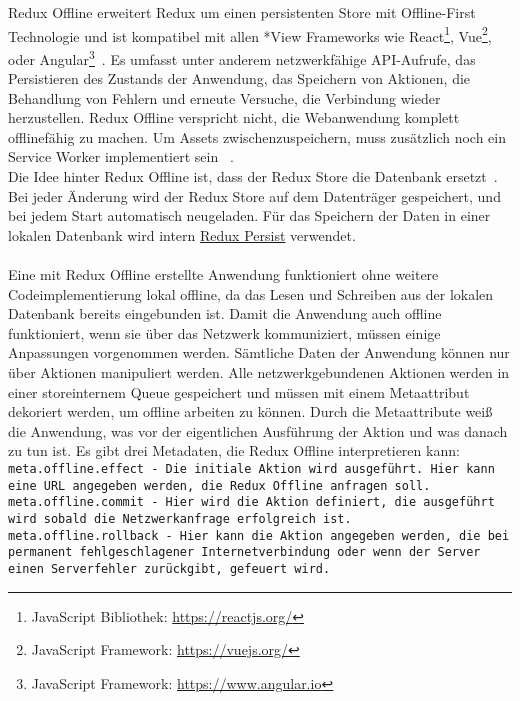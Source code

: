 % 
% 
Redux Offline erweitert Redux um einen persistenten Store mit Offline-First Technologie und ist kompatibel mit allen *View Frameworks wie React\footnote{JavaScript Bibliothek: \url{https://reactjs.org/}}, Vue\footnote{JavaScript Framework: \url{https://vuejs.org/}}, oder Angular\footnote{JavaScript Framework: \url{https://www.angular.io}}~\cite{redux-offline-compabilaty}.
Es umfasst unter anderem netzwerkfähige \gls{API}-Aufrufe, das Persistieren des Zustands der Anwendung, das Speichern von Aktionen, die Behandlung von Fehlern und erneute Versuche, die Verbindung wieder herzustellen.
Redux Offline verspricht nicht, die Webanwendung komplett offlinefähig zu machen.
Um \gls{Assets} zwischenzuspeichern, muss zusätzlich noch ein Service Worker implementiert sein ~\cite{redux-offline-gh}.\\
Die Idee hinter Redux Offline ist, dass der Redux Store die Datenbank ersetzt~\cite{redux-offline}.
Bei jeder Änderung wird der Redux Store auf dem Datenträger gespeichert, und bei jedem Start automatisch neugeladen.
Für das Speichern der Daten in einer lokalen Datenbank wird intern \hyperref[sub:reduxpersist]{Redux Persist} verwendet.\\\\
%
%
Eine mit Redux Offline erstellte Anwendung funktioniert ohne weitere Codeimplementierung lokal offline, da das Lesen und Schreiben aus der lokalen Datenbank bereits eingebunden ist.
Damit die Anwendung auch offline funktioniert, wenn sie über das Netzwerk kommuniziert, müssen einige Anpassungen vorgenommen werden.
Sämtliche Daten der Anwendung können nur über Aktionen manipuliert werden. 
Alle netzwerkgebundenen Aktionen werden in einer storeinternem \gls{Queue} gespeichert und müssen mit einem Metaattribut dekoriert werden, um offline arbeiten zu können. Durch die Metaattribute weiß die Anwendung, was vor der eigentlichen Ausführung der Aktion und was danach zu tun ist. 
Es gibt drei Metadaten, die Redux Offline interpretieren kann:\\
\tt{meta.offline.effect} - Die initiale Aktion wird ausgeführt. Hier kann eine URL angegeben werden, die Redux Offline anfragen soll.\\
\tt{meta.offline.commit} - Hier wird die Aktion definiert, die ausgeführt wird sobald die Netzwerkanfrage erfolgreich ist.\\
\tt{meta.offline.rollback} - Hier kann die Aktion angegeben werden, die bei permanent fehlgeschlagener Internetverbindung oder wenn der Server einen Serverfehler zurückgibt, gefeuert wird.
